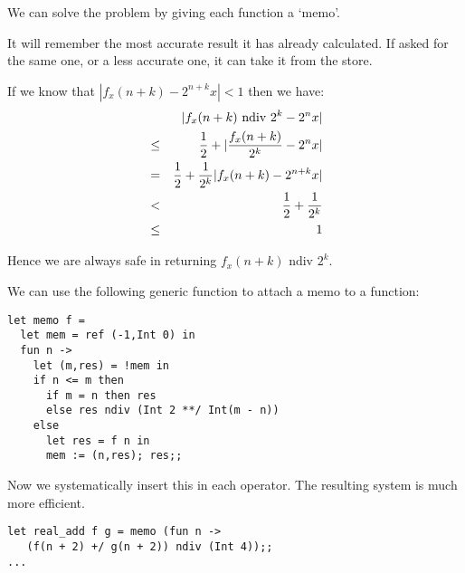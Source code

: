 \begin{slide*}


\vspace*{0.5cm}

We can solve the problem by giving each function a `memo'.

It will remember the most accurate result it has already calculated. If asked
for the same one, or a less accurate one, it can take it from the store.

If we know that {\red $|f_x(n + k) - 2^{n + k} x| < 1$} then we have:
{\red \begin{eqnarray*}
&      & |f_x(n + k) \mbox{ ndiv } 2^ k - 2^n x|                        \\
& \leq & {1 \over 2} + |{f_x(n + k) \over 2^k} - 2^n x|                 \\
& =    & {1 \over 2} + {1 \over 2^k} |f_x(n + k) - 2^{n + k} x|         \\
& <    & {1 \over 2} + {1 \over 2^k}                                    \\
& \leq & 1
\end{eqnarray*}}

Hence we are always safe in returning {\red $f_x(n + k) \mbox{ ndiv } 2^k$}.

\end{slide*}



\begin{slide*}


\vspace*{0.5cm}

We can use the following generic function to attach a memo to a function:
\begin{black}\begin{verbatim}
let memo f =
  let mem = ref (-1,Int 0) in
  fun n ->
    let (m,res) = !mem in
    if n <= m then
      if m = n then res
      else res ndiv (Int 2 **/ Int(m - n))
    else
      let res = f n in
      mem := (n,res); res;;
\end{verbatim}\end{black}
Now we systematically insert this in each operator. The resulting system is
much more efficient.
\begin{black}\begin{verbatim}
let real_add f g = memo (fun n ->
   (f(n + 2) +/ g(n + 2)) ndiv (Int 4));;
...
\end{verbatim}\end{black}

\end{slide*}






